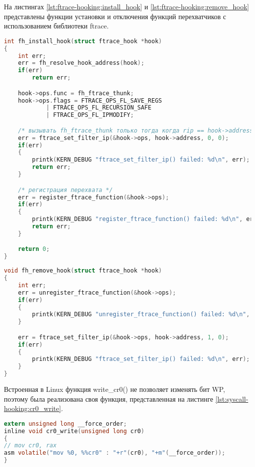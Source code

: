     На листингах \ref{lst:ftrace-hooking:install_hook} и \ref{lst:ftrace-hooking:remove_hook} представлены
    функции установки и отключения функций перехватчиков с использованием библиотеки ftrace.

    \begin{lstlisting}[language=C, label=lst:ftrace-hooking:install_hook, caption=Установка перехвата функции]
int fh_install_hook(struct ftrace_hook *hook)
{
    int err;
    err = fh_resolve_hook_address(hook);
    if(err)
        return err;

    hook->ops.func = fh_ftrace_thunk;
    hook->ops.flags = FTRACE_OPS_FL_SAVE_REGS
            | FTRACE_OPS_FL_RECURSION_SAFE
            | FTRACE_OPS_FL_IPMODIFY;

    /* вызывать fh_ftrace_thunk только тогда когда rip == hook->address */
    err = ftrace_set_filter_ip(&hook->ops, hook->address, 0, 0);
    if(err)
    {
        printk(KERN_DEBUG "ftrace_set_filter_ip() failed: %d\n", err);
        return err;
    }

    /* регистрация перехвата */
    err = register_ftrace_function(&hook->ops);
    if(err)
    {
        printk(KERN_DEBUG "register_ftrace_function() failed: %d\n", err);
        return err;
    }

    return 0;
}
    \end{lstlisting}

    \begin{lstlisting}[language=C, label=lst:ftrace-hooking:remove_hook, caption=Отключение перехвата функции]
void fh_remove_hook(struct ftrace_hook *hook)
{
    int err;
    err = unregister_ftrace_function(&hook->ops);
    if(err)
    {
        printk(KERN_DEBUG "unregister_ftrace_function() failed: %d\n", err);
    }

    err = ftrace_set_filter_ip(&hook->ops, hook->address, 1, 0);
    if(err)
    {
        printk(KERN_DEBUG "ftrace_set_filter_ip() failed: %d\n", err);
    }
}
    \end{lstlisting}

    Встроенная в Linux функция write\_cr0() не позволяет изменять бит WP, 
    поэтому была реализована своя функция, представленная на листинге \ref{lst:syscall-hooking:cr0_write}.
    \begin{lstlisting}[language=C, label=lst:syscall-hooking:cr0_write, caption=Функция изменения значения регистра cr0]
extern unsigned long __force_order;
inline void cr0_write(unsigned long cr0)
{
// mov cr0, rax
asm volatile("mov %0, %%cr0" : "+r"(cr0), "+m"(__force_order));
}
    \end{lstlisting}

